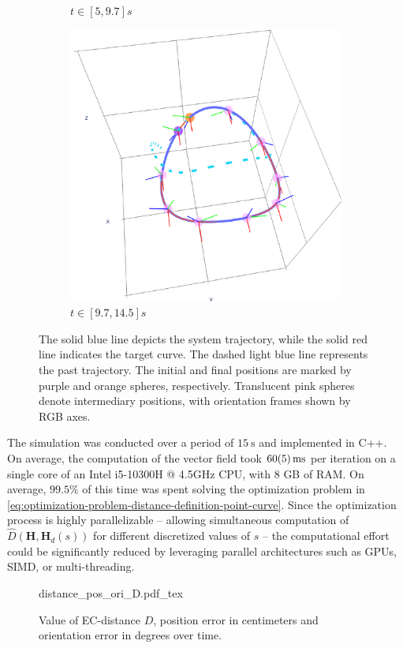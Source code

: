 \begin{figure}[ht!]
\begin{subfigure}[b]{0.32\textwidth}
        \caption{$t\in[5, 9.7]s$}
        \label{fig:vfplot-second}
    \end{subfigure}
    \hfill
    \begin{subfigure}[b]{0.32\textwidth}
        \centering
        \includegraphics[width=\textwidth]{figures/vf_automatica_3.pdf} %
        \caption{$t\in[9.7, 14.5]s$}
        \label{fig:vfplot-third}
    \end{subfigure}
    \caption{The solid blue line depicts the system trajectory, while the solid red line indicates the target curve. The dashed light blue line represents the past trajectory. The initial and final positions are marked by purple and orange spheres, respectively. Translucent pink spheres denote intermediary positions, with orientation frames shown by RGB axes.}
    \label{fig:vfplot-trajectory}
\end{figure}
The simulation was conducted over a period of $\qty{15}{\second}$ and implemented in C++. On average, the computation of the vector field took $\qty{60 \pm 5}{\milli\second}$ per iteration on a single core of an Intel i5-10300H @ 4.5GHz CPU, with 8 GB of RAM. On average, $99.5\%$ of this time was spent solving the optimization problem in \eqref{eq:optimization-problem-distance-definition-point-curve}. Since the optimization process is highly parallelizable -- allowing simultaneous computation of $\widehat{D}(\mathbf{H},\mathbf{H}_d(s))$ for different discretized values of $s$ -- the computational effort could be significantly reduced by leveraging parallel architectures such as GPUs, SIMD, or multi-threading.
\begin{figure}[ht!]
    \centering
    \def\svgwidth{\linewidth}
    {\footnotesize{distance_pos_ori_D.pdf_tex}}
    \caption{Value of EC-distance $D$, position error in centimeters and orientation error in degrees over time.}
    \label{fig:position-orientation-errors}
\end{figure}


